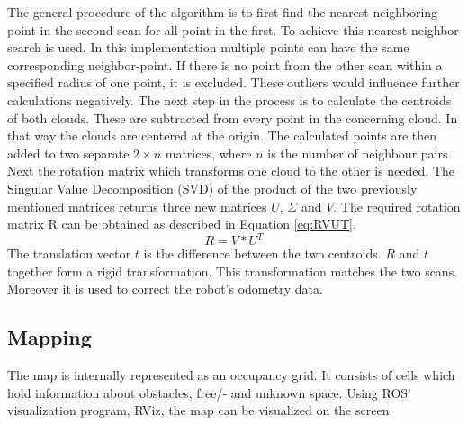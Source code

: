 \documentclass{ba-kecs}
\begin{document}
The general procedure of the algorithm is to first find the nearest neighboring point in the second scan for all point in the first. To achieve this nearest neighbor search is used.
In this implementation multiple points can have the same corresponding neighbor-point. If there is no point from the other scan within a specified radius of one point, it is excluded. These outliers would influence further calculations negatively.
The next step in the process is to calculate the centroids of both clouds. These are subtracted from every point in the concerning cloud. In that way the clouds are centered at the origin. The calculated points are then added to two separate $2 \times n$ matrices, where $n$ is the number of neighbour pairs. Next the rotation matrix which transforms one cloud to the other is needed. The Singular Value Decomposition (SVD) of the product of the two previously mentioned matrices returns three new matrices $U$, $\Sigma$ and $V$. The required rotation matrix R can be obtained as described in Equation \ref{eq:RVUT}.
\begin{equation}
\label{eq:RVUT}
 R = V * U^T
\end{equation}
The translation vector $t$ is the difference between the two centroids. $R$ and $t$ together form a rigid transformation. This transformation matches the two scans. Moreover it is used to correct the robot's odometry data.

\subsection{Mapping}\label{sec:mapping}

The map is internally represented as an occupancy grid. It consists of cells which hold information about obstacles, free/- and unknown space. Using ROS' visualization program, RViz, the map can be visualized on the screen.
\end{document}
